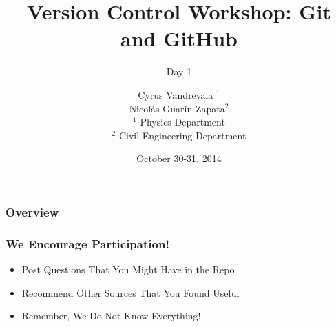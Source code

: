 



\title{Version Control Workshop: Git and GitHub}
\subtitle{Day 1}
\author[AUTHOR]{\scriptsize{Cyrus Vandrevala $^1$\\Nicol\'as Guar\'in-Zapata$^2$}\\
\tiny{$^1$ Physics Department\\ $^2$ Civil Engineering Department}}
\date{October 30-31, 2014}




\begin{frame}[plain]
\titlepage
\end{frame}

\begin{frame}
\frametitle{\large{Overview}}
\tableofcontents
\end{frame}

\begin{frame}
\frametitle{\large{We Encourage Participation!}}
\begin{itemize}
\item Post Questions That You Might Have in the Repo
\item Recommend Other Sources That You Found Useful
\item Remember, We Do Not Know Everything!
\end{itemize}
\end{frame}















